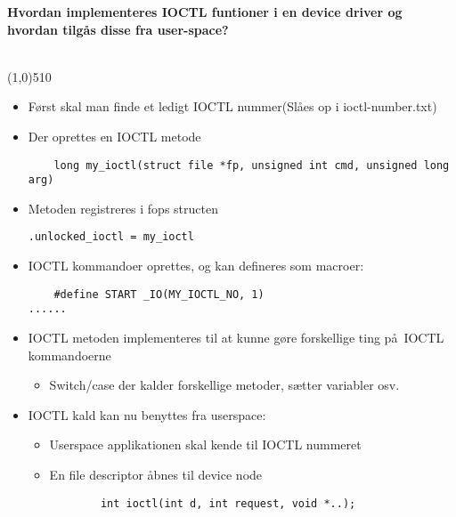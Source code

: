 \documentclass{paper}
\begin{document}
\begin{large}\textbf{Hvordan implementeres IOCTL funtioner i en device driver og hvordan tilg\aa s disse fra user-space?}\end{large}\\
\line(1,0){510}
\begin{itemize}
	\item F\o rst skal man finde et ledigt IOCTL nummer(Sl\aa es op i ioctl-number.txt)
	\item Der oprettes en IOCTL metode
\begin{lstlisting}
	long my_ioctl(struct file *fp, unsigned int cmd, unsigned long arg)
\end{lstlisting}
	\item Metoden registreres i fops structen
\begin{lstlisting}
.unlocked_ioctl = my_ioctl
\end{lstlisting}
	\item IOCTL kommandoer oprettes, og kan defineres som macroer:
\begin{lstlisting}
	#define START _IO(MY_IOCTL_NO, 1)
......
\end{lstlisting}
 \item IOCTL metoden implementeres til at kunne g\o re forskellige ting p\aa\ IOCTL kommandoerne
 \begin{itemize}
 \item Switch/case der kalder forskellige metoder, s\ae tter variabler osv.
 \end{itemize}
 \item IOCTL kald kan nu benyttes fra userspace:
	\begin{itemize}
		\item Userspace applikationen skal kende til IOCTL nummeret
		\item En file descriptor \aa bnes til device node
	\begin{lstlisting}
		int ioctl(int d, int request, void *..);
	\end{lstlisting}
	\end{itemize}
\end{itemize}
\end{document}
